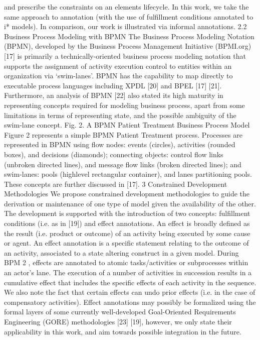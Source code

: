 and prescribe the constraints on an elements lifecycle. In this work, we take the same
approach to annotation (with the use of fulfillment conditions annotated to i* models). In comparison, our work is illustrated via informal annotations.
2.2 Business Process Modeling with BPMN
The Business Process Modeling Notation (BPMN), developed by the Business Process Management Initiative (BPMI.org) [17] is primarily a technically-oriented business process modeling notation that supports the assignment of activity execution
control to entities within an organization via ‘swim-lanes’. BPMN has the capability
to map directly to executable process languages including XPDL [20] and BPEL [17]
[21]. Furthermore, an analysis of BPMN [22] also stated its high maturity in representing concepts required for modeling business process, apart from some limitations
in terms of representing state, and the possible ambiguity of the swim-lane concept.
Fig. 2. A BPMN Patient Treatment Business Process Model
Figure 2 represents a simple BPMN Patient Treatment process. Processes are represented in BPMN using flow nodes: events (circles), activities (rounded boxes), and
decisions (diamonds); connecting objects: control flow links (unbroken directed
lines), and message flow links (broken directed lines); and swim-lanes: pools (highlevel rectangular container), and lanes partitioning pools. These concepts are further
discussed in [17].
3 Constrained Development Methodologies
We propose constrained development methodologies to guide the derivation or maintenance of one type of model given the availability of the other. The development is
supported with the introduction of two concepts: fulfillment conditions (i.e. as in [19])
and effect annotations.
An effect is broadly defined as the result (i.e. product or outcome) of an activity
being executed by some cause or agent. An effect annotation is a specific statement
relating to the outcome of an activity, associated to a state altering construct in a
given model. During BPM
2
, effects are annotated to atomic tasks/activities or subprocesses within an actor’s lane. The execution of a number of activities in succession results in a cumulative effect that includes the specific effects of each activity in
the sequence. We also note the fact that certain effects can undo prior effects (i.e. in
the case of compensatory activities). Effect annotations may possibly be formalized
using the formal layers of some currently well-developed Goal-Oriented Requirements Engineering (GORE) methodologies [23] [19], however, we only state their
applicability in this work, and aim towards possible integration in the future.
